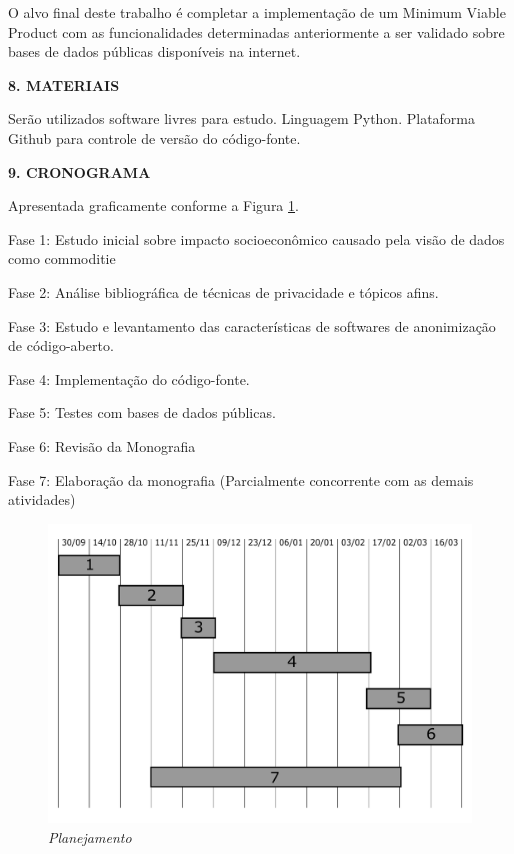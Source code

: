 \documentclass[a4paper,12pt,oneside,openany]{report}
\begin{document}
O alvo final deste trabalho é completar a implementação de um Minimum Viable Product com as funcionalidades determinadas anteriormente a ser validado sobre bases de dados públicas disponíveis na internet.

\vspace{0.4cm}
\textbf{8. MATERIAIS}
	
Serão utilizados software livres para estudo. Linguagem Python. Plataforma Github para controle de versão do código-fonte.

\vspace{0.4cm}
\textbf{9. CRONOGRAMA}

Apresentada graficamente conforme a Figura \ref{Fig:Cronograma}.

Fase 1: Estudo inicial sobre impacto socioeconômico causado pela visão de dados como commoditie

Fase 2: Análise bibliográfica de técnicas de privacidade e tópicos afins.

Fase 3: Estudo e levantamento das características de softwares de anonimização de código-aberto.

Fase 4: Implementação do código-fonte.

Fase 5: Testes com bases de dados públicas.

Fase 6: Revisão da Monografia

Fase 7: Elaboração da monografia (Parcialmente concorrente com as demais atividades)


\begin{figure}
\begin{center}
\parbox[h]{14cm}
  {
  \begin{center}
  \includegraphics[scale=0.45]{Figuras/gantt.pdf}
  \caption[\small{\textit{Planejamento}}]{\label{Fig:Cronograma} \footnotesize{\textit{Planejamento}}}
  \end{center}
  }
\end{center}
\end{figure} 
\end{document}
